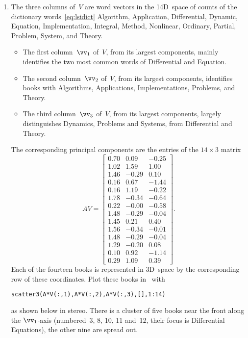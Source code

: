 \begin{enumerate}
\item The three columns of~\(V\) are word vectors in the 14D~space of counts of the dictionary words~\eqref{eq:lsidict} Algorithm,
Application,
Differential,
Dynamic,
Equation,
Implementation,
Integral,
Method,
Nonlinear,
Ordinary,
Partial,
Problem,
System, and
Theory.
\begin{itemize}
\item The first column~\(\vv_1\) of~\(V\), from its largest components, mainly identifies the two most common words of Differential and Equation.
\item The second column~\(\vv_2\) of~\(V\), from its largest components, identifies books with Algorithms, Applications, Implementations, Problems, and Theory.
\item The third column~\(\vv_3\) of~\(V\), from its largest components, largely distinguishes Dynamics, Problems and Systems, from Differential and Theory.
\end{itemize}
The corresponding principal components are the entries of the \(14\times3\) matrix \twodp
\begin{equation*}
AV=\begin{bmatrix} 0.70 & 0.09 & -0.25
\\1.02 & 1.59 & 1.00
\\1.46 & -0.29 & 0.10
\\0.16 & 0.67 & -1.44
\\0.16 & 1.19 & -0.22
\\1.78 & -0.34 & -0.64
\\0.22 & -0.00 & -0.58
\\1.48 & -0.29 & -0.04
\\1.45 & 0.21 & 0.40
\\1.56 & -0.34 & -0.01
\\1.48 & -0.29 & -0.04
\\1.29 & -0.20 & 0.08
\\0.10 & 0.92 & -1.14
\\0.29 & 1.09 & 0.39 \end{bmatrix}.
\end{equation*}
Each of the fourteen books is represented in 3D~space by the corresponding row of these coordinates.
Plot these books in \script\ with 
\begin{verbatim}
scatter3(A*V(:,1),A*V(:,2),A*V(:,3),[],1:14)
\end{verbatim}
as shown below in stereo.
There is a cluster of five books near the front along the \(\vv_1\)-axis (numbered~3, 8, 10, 11 and~12, their focus is Differential Equations), the other nine are spread out.
\end{enumerate}



